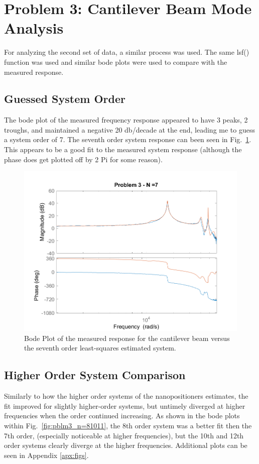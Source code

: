 \documentclass[]{article}
\renewcommand{\figurename}{Fig.}
\begin{document}
\newpage
\section{Problem 3: Cantilever Beam Mode Analysis}
	For analyzing the second set of data, a similar process was used. The same lsf() function was used and similar bode plots were used to compare with the measured response.
	\subsection{Guessed System Order}
		The bode plot of the measured frequency response appeared to have 3 peaks, 2 troughs, and maintained a negative 20 db/decade at the end, leading me to guess a system order of 7. The seventh order system response can been seen in \figurename \ \ref{fig:pblm3_n_7}. This appears to be a good fit to the measured system response (although the phase does get plotted off by 2 Pi for some reason).

		\begin{figure}[h]
			\centering
			\includegraphics[width=0.75\linewidth]{fig/MECH6325_CA1_pblm3_n=7}
			\caption{Bode Plot of the measured response for the cantilever beam versus the seventh order least-squares estimated system.}
			\label{fig:pblm3_n_7}
		\end{figure}
	
	\subsection{Higher Order System Comparison}
		Similarly to how the higher order systems of the nanopositioners estimates, the fit improved for slightly higher-order systems, but untimely diverged at higher frequencies when the order continued increasing. As shown in the bode plots within \figurename \ \ref{fig:pblm3_n=81011}, the 8th order system was a better fit then the 7th order, (especially noticeable at higher frequencies), but the 10th and 12th order systems clearly diverge at the higher frequencies. Additional plots can be seen in Appendix \ref{apx:figs}.
		
\end{document}
